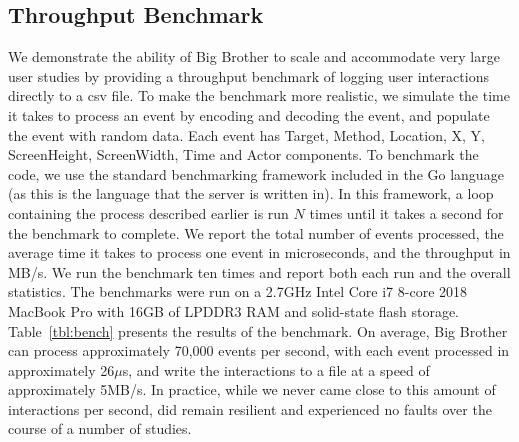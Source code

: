 \vspace{-8pt}
\subsection{Throughput Benchmark}

We demonstrate the ability of Big Brother to scale and accommodate very large user studies by providing a throughput benchmark of logging user interactions directly to a csv file. To make the benchmark more realistic, we simulate the time it takes to process an event by encoding and decoding the event, and populate the event with random data. Each event has Target, Method, Location, X, Y, ScreenHeight, ScreenWidth, Time and Actor components. To benchmark the code, we use the standard benchmarking framework included in the Go language (as this is the language that the server is written in). In this framework, a loop containing the process described earlier is run $N$ times until it takes a second for the benchmark to complete. We report the total number of events processed, the average time it takes to process one event in microseconds, and the throughput in MB/s. We run the benchmark ten times and report both each run and the overall statistics. The benchmarks were run on a 2.7GHz Intel Core i7 8-core 2018 MacBook Pro with 16GB of LPDDR3 RAM and solid-state flash storage. Table~\ref{tbl:bench} presents the results of the benchmark. On average, Big Brother can process approximately 70,000 events per second, with each event processed in approximately 26$\mu$s, and write the interactions to a file at a speed of approximately 5MB/s. In practice, while we never came close to this amount of interactions per second, \bb did remain resilient and experienced no faults over the course of a number of studies.


